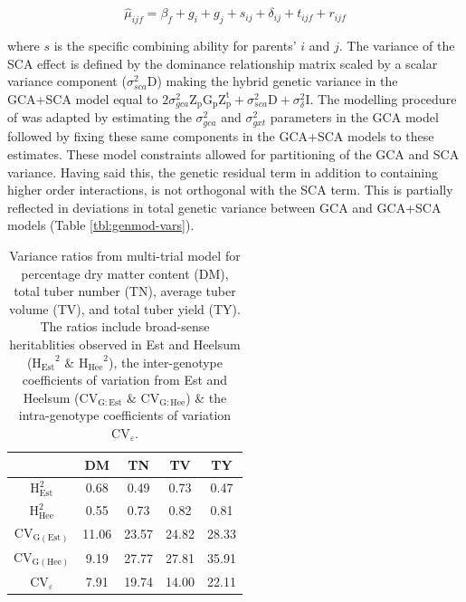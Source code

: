 \begin{equation}
 \hat{\mu}_{ijf} = \beta_f + g_i+g_j+s_{ij}+\delta_{ij}+t_{ijf}+r_{ijf}
\label{eq:sca}
\end{equation}

where \(s\) is the specific combining ability for parents' \(i\) and \(j\). The variance of the SCA effect is defined by the dominance relationship matrix scaled by a scalar variance component (\(\sigma^2_{sca} \mathrm{D}\)) making the hybrid genetic variance in the GCA+SCA model equal to \(2\sigma^2_{gca}\mathrm{Z_pG_pZ_p^t}+\sigma^2_{sca}\mathrm{D}+\sigma^2_{\delta}\mathrm I\). The modelling procedure of \cite{Endelman2018} was adapted by estimating the \(\sigma^2_{gca}\) and \(\sigma^2_{gxt}\) parameters in the GCA model followed by fixing these same components in the GCA+SCA models to these estimates. These model constraints allowed for partitioning of the GCA and SCA variance. Having said this, the genetic residual term in addition to containing higher order interactions, is not orthogonal with the SCA term. This is partially reflected in deviations in total genetic variance between GCA and GCA+SCA models (Table \ref{tbl:genmod-vars}).

\begin{table}
    \caption{Variance ratios from multi-trial model for percentage dry matter content (DM), total tuber number (TN), average tuber volume (TV), and total tuber yield (TY). The ratios include broad-sense heritablities observed in Est and Heelsum (\(\mathrm{H_{Est}}^2\) \& \(\mathrm{H_{Hee}}^2\)), the inter-genotype coefficients of variation from Est and Heelsum (\(\mathrm{CV_{G:Est}}\) \& \(\mathrm{CV_{G:Hee}}\)) \&  the intra-genotype coefficients of variation \(\mathrm{CV}_{\varepsilon}\).}
\label{tbl:trait-variances}
\begin{tabular}{ccccc}
\toprule
 & DM & TN & TV & TY\\
\midrule
\(\mathrm{H_{Est}^2}\) & 0.68 & 0.49 & 0.73 & 0.47\\
\(\mathrm{H_{Hee}^2}\) & 0.55 & 0.73 & 0.82 & 0.81\\
\(\mathrm{CV_{G(Est)}}\) & 11.06 & 23.57 & 24.82 & 28.33\\
\(\mathrm{CV_{G(Hee)}}\) & 9.19 & 27.77 & 27.81 & 35.91\\
\(\mathrm{CV}_{\varepsilon}\) & 7.91 & 19.74 & 14.00 & 22.11\\
\bottomrule
\end{tabular}
\end{table}



